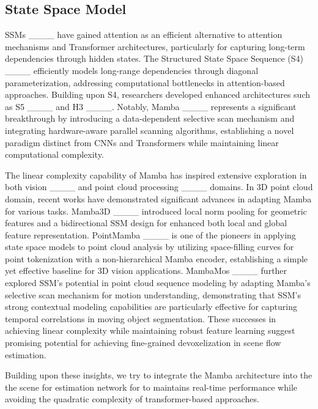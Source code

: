 \subsection{State Space Model}
SSMs ____ have gained attention as an efficient alternative to attention mechanisms and Transformer architectures, particularly for capturing long-term dependencies through hidden states. The Structured State Space Sequence (S4) ____ efficiently models long-range dependencies through diagonal parameterization, addressing computational bottlenecks in attention-based approaches. Building upon S4, researchers developed enhanced architectures such as S5 ____ and H3 ____. Notably, Mamba ____ represents a significant breakthrough by introducing a data-dependent selective scan mechanism and integrating hardware-aware parallel scanning algorithms, establishing a novel paradigm distinct from CNNs and Transformers while maintaining linear computational complexity.

The linear complexity capability of Mamba has inspired extensive exploration in both vision ____ and point cloud processing ____ domains. In 3D point cloud domain, recent works have demonstrated significant advances in adapting Mamba for various tasks. Mamba3D ____ introduced local norm pooling for geometric features and a bidirectional SSM design for enhanced both local and global feature representation. PointMamba ____ is one of the pioneers in applying state space models to point cloud analysis by utilizing space-filling curves for point tokenization with a non-hierarchical Mamba encoder, establishing a simple yet effective baseline for 3D vision applications. 
MambaMos ____ further explored SSM's potential in point cloud sequence modeling by adapting Mamba's selective scan mechanism for motion understanding, demonstrating that SSM's strong contextual modeling capabilities are particularly effective for capturing temporal correlations in moving object segmentation. These successes in achieving linear complexity while maintaining robust feature learning suggest promising potential for achieving fine-grained devoxelization in scene flow estimation.

Building upon these insights, we try to integrate the Mamba architecture into the the scene for estimation network for to maintains real-time performance while avoiding the quadratic complexity of transformer-based approaches.
